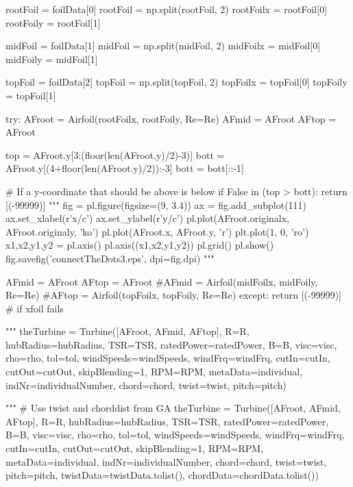 \begin{pythoncode}
    rootFoil = foilData[0]
    rootFoil = np.split(rootFoil, 2) 
    rootFoilx = rootFoil[0]
    rootFoily = rootFoil[1]

    midFoil = foilData[1]
    midFoil = np.split(midFoil, 2) 
    midFoilx = midFoil[0]
    midFoily = midFoil[1]

    topFoil = foilData[2]
    topFoil = np.split(topFoil, 2) 
    topFoilx = topFoil[0]
    topFoily = topFoil[1]


    try:
        AFroot = Airfoil(rootFoilx, rootFoily, Re=Re)
        AFmid = AFroot
        AFtop = AFroot

        top = AFroot.y[3:(floor(len(AFroot.y)/2)-3)]
        bott = AFroot.y[(4+floor(len(AFroot.y)/2)):-3]
        bott = bott[::-1]

        # If a y-coordinate that should be above is below
        if False in (top > bott): 
            return [(-99999)]
        """
        fig = pl.figure(figsize=(9, 3.4))
        ax = fig.add_subplot(111)
        ax.set_xlabel(r'x/c')
        ax.set_ylabel(r'y/c')
        pl.plot(AFroot.originalx, AFroot.originaly, 'ko')
        pl.plot(AFroot.x, AFroot.y, 'r')
        plt.plot(1, 0, 'ro')
        x1,x2,y1,y2 = pl.axis()
        pl.axis((x1,x2,y1,y2))
        pl.grid()
        pl.show()
        fig.savefig('connectTheDots3.eps', dpi=fig.dpi)
        """

        AFmid = AFroot
        AFtop = AFroot
        #AFmid = Airfoil(midFoilx, midFoily, Re=Re)
        #AFtop = Airfoil(topFoilx, topFoily, Re=Re)
    except:
        return [(-99999)] # if xfoil fails

    """
    theTurbine = Turbine([AFroot, AFmid, AFtop], R=R, hubRadius=hubRadius, TSR=TSR, 
                          ratedPower=ratedPower, B=B, visc=visc, rho=rho, tol=tol, 
                          windSpeeds=windSpeeds, windFrq=windFrq, cutIn=cutIn, 
                          cutOut=cutOut, skipBlending=1, RPM=RPM, metaData=individual, indNr=individualNumber,
                          chord=chord, twist=twist, pitch=pitch)

    """
    # Use twist and chorddist from GA
    theTurbine = Turbine([AFroot, AFmid, AFtop], R=R, hubRadius=hubRadius, TSR=TSR, 
                          ratedPower=ratedPower, B=B, visc=visc, rho=rho, tol=tol, 
                          windSpeeds=windSpeeds, windFrq=windFrq, cutIn=cutIn, 
                          cutOut=cutOut, skipBlending=1, RPM=RPM, metaData=individual, indNr=individualNumber,
                          chord=chord, twist=twist, pitch=pitch,
                          twistData=twistData.tolist(), chordData=chordData.tolist())
    

\end{pythoncode}
